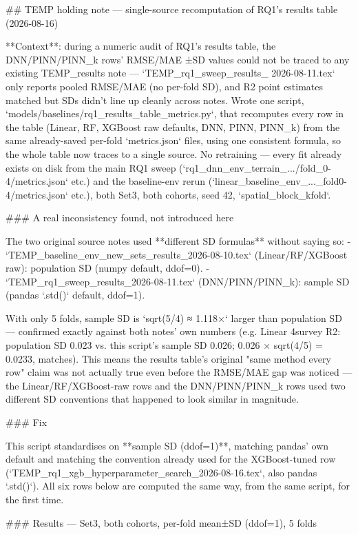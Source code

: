 ## TEMP holding note — single-source recomputation of RQ1's results table (2026-08-16)

**Context**: during a numeric audit of RQ1's results table, the DNN/PINN/PINN_k rows' RMSE/MAE
±SD values could not be traced to any existing TEMP_results note — `TEMP_rq1_sweep_results_
2026-08-11.tex` only reports pooled RMSE/MAE (no per-fold SD), and R2 point estimates matched but
SDs didn't line up cleanly across notes. Wrote one script,
`models/baselines/rq1_results_table_metrics.py`, that recomputes every row in the table (Linear,
RF, XGBoost raw defaults, DNN, PINN, PINN_k) from the same already-saved per-fold `metrics.json`
files, using one consistent formula, so the whole table now traces to a single source. No
retraining — every fit already exists on disk from the main RQ1 sweep
(`rq1_dnn_env_terrain_.../fold_{0-4}/metrics.json` etc.) and the baseline-env rerun
(`linear_baseline_env_..._fold{0-4}/metrics.json` etc.), both Set3, both cohorts, seed 42,
`spatial_block_kfold`.

### A real inconsistency found, not introduced here

The two original source notes used **different SD formulas** without saying so:
- `TEMP_baseline_env_new_sets_results_2026-08-10.tex` (Linear/RF/XGBoost raw): population SD
  (numpy default, ddof=0).
- `TEMP_rq1_sweep_results_2026-08-11.tex` (DNN/PINN/PINN_k): sample SD (pandas `.std()` default,
  ddof=1).

With only 5 folds, sample SD is `sqrt(5/4) ≈ 1.118×` larger than population SD — confirmed exactly
against both notes' own numbers (e.g. Linear 4survey R2: population SD 0.023 vs. this script's
sample SD 0.026; 0.026 × sqrt(4/5) = 0.0233, matches). This means the results table's original
"same method every row" claim was not actually true even before the RMSE/MAE gap was noticed — the
Linear/RF/XGBoost-raw rows and the DNN/PINN/PINN_k rows used two different SD conventions that
happened to look similar in magnitude.

### Fix

This script standardises on **sample SD (ddof=1)**, matching pandas' own default and matching the
convention already used for the XGBoost-tuned row
(`TEMP_rq1_xgb_hyperparameter_search_2026-08-16.tex`, also pandas `.std()`). All six rows below are
computed the same way, from the same script, for the first time.

### Results — Set3, both cohorts, per-fold mean±SD (ddof=1), 5 folds

